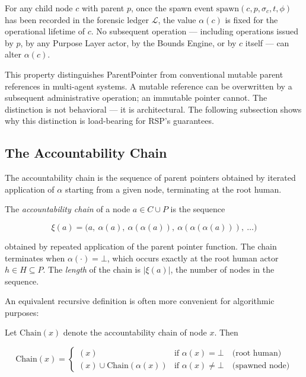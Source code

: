 \begin{prop}
\label{prop:parent-pointer-immutable}
For any child node $c$ with parent $p$, once the spawn event $\mathrm{spawn}(c, p, \sigma_c, t, \phi)$ has been recorded in the forensic ledger $\mathcal{L}$, the value $\alpha(c)$ is fixed for the operational lifetime of $c$. No subsequent operation — including operations issued by $p$, by any Purpose Layer actor, by the Bounds Engine, or by $c$ itself — can alter $\alpha(c)$.
\end{prop}

This property distinguishes ParentPointer from conventional mutable parent references in multi-agent systems. A mutable reference can be overwritten by a subsequent administrative operation; an immutable pointer cannot. The distinction is not behavioral — it is architectural. The following subsection shows why this distinction is load-bearing for RSP's guarantees.

\subsection{The Accountability Chain}
\label{sec:accountability-chain}

The accountability chain is the sequence of parent pointers obtained by iterated application of $\alpha$ starting from a given node, terminating at the root human.

\begin{dfn}
\label{dfn:accountability-chain}
The \emph{accountability chain} of a node $a \in C \cup P$ is the sequence

\begin{equation}
\xi(a) = \bigl( a,\ \alpha(a),\ \alpha(\alpha(a)),\ \alpha(\alpha(\alpha(a))),\ \ldots \bigr)
\end{equation}

obtained by repeated application of the parent pointer function. The chain terminates when $\alpha(\cdot) = \bot$, which occurs exactly at the root human actor $h \in H \subseteq P$. The \emph{length} of the chain is $|\xi(a)|$, the number of nodes in the sequence.
\end{dfn}

An equivalent recursive definition is often more convenient for algorithmic purposes:

\begin{dfn}
\label{dfn:chain-recursive}
Let $\mathrm{Chain}(x)$ denote the accountability chain of node $x$. Then

\begin{equation}
\mathrm{Chain}(x) =
\begin{cases}
(x) & \text{if } \alpha(x) = \bot \quad \text{(root human)} \\[6pt]
(x) \cup \mathrm{Chain}(\alpha(x)) & \text{if } \alpha(x) \neq \bot \quad \text{(spawned node)}
\end{cases}
\end{equation}
\end{dfn}

